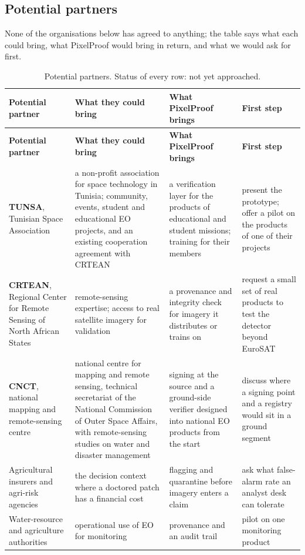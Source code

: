 \subsection{Potential partners}
None of the organisations below has agreed to anything; the table says what each could bring, what PixelProof would bring in return, and what we would ask for first.
{\small
\begin{longtable}{|L{2.9cm}|L{3.9cm}|L{3.9cm}|L{3.9cm}|}
\caption{Potential partners. Status of every row: not yet approached.}\\
\hline
\textbf{Potential partner} & \textbf{What they could bring} & \textbf{What PixelProof brings} & \textbf{First step}\\
\hline
\endfirsthead
\hline
\textbf{Potential partner} & \textbf{What they could bring} & \textbf{What PixelProof brings} & \textbf{First step}\\
\hline
\endhead
\textbf{TUNSA}, Tunisian Space Association & a non-profit association for space technology in Tunisia; community, events, student and educational EO projects, and an existing cooperation agreement with CRTEAN \cite{tunsa} & a verification layer for the products of educational and student missions; training for their members & present the prototype; offer a pilot on the products of one of their projects\\
\hline
\textbf{CRTEAN}, Regional Center for Remote Sensing of North African States & remote-sensing expertise; access to real satellite imagery for validation \cite{tunsa} & a provenance and integrity check for imagery it distributes or trains on & request a small set of real products to test the detector beyond EuroSAT\\
\hline
\textbf{CNCT}, national mapping and remote-sensing centre & national centre for mapping and remote sensing, technical secretariat of the National Commission of Outer Space Affairs, with remote-sensing studies on water and disaster management \cite{tnsat} & signing at the source and a ground-side verifier designed into national EO products from the start & discuss where a signing point and a registry would sit in a ground segment\\
\hline
Agricultural insurers and agri-risk agencies & the decision context where a doctored patch has a financial cost & flagging and quarantine before imagery enters a claim & ask what false-alarm rate an analyst desk can tolerate\\
\hline
Water-resource and agriculture authorities & operational use of EO for monitoring & provenance and an audit trail & pilot on one monitoring product\\

\end{longtable}}
